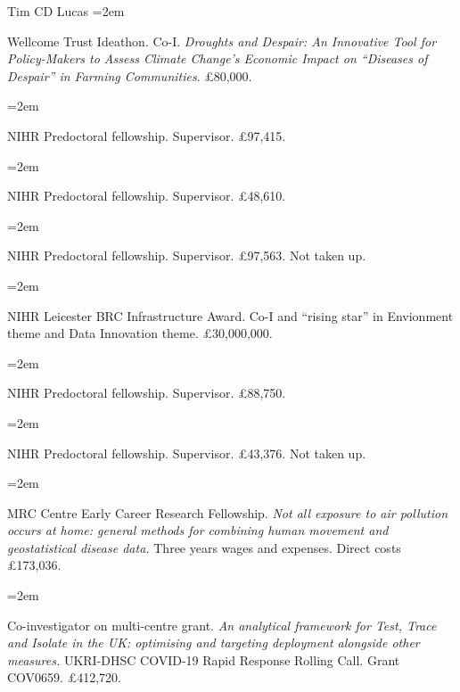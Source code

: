 \documentclass{scrartcl}
\newcommand{\MarginText}[1]{\marginpar{\raggedleft\itshape\small#1}} %
\newcommand{\Description}[1]{\hangindent=2em\hangafter=0\noindent\raggedright\footnotesize{#1}\par\normalsize\vspace{1em}} %
\begin{document}
\begin{cv}{Tim {\Large CD} Lucas}
\Description{Wellcome Trust Ideathon. Co-I. \emph{Droughts and Despair: An Innovative Tool for Policy-Makers to Assess Climate Change's Economic Impact on “Diseases of Despair” in Farming Communities}. £80,000.}
\vspace{-0.5em} %

\Description{NIHR Predoctoral fellowship. Supervisor. £97,415.}
\vspace{-0.5em} %

\Description{NIHR Predoctoral fellowship. Supervisor. £48,610.}
\vspace{-0.5em} %

\Description{NIHR Predoctoral fellowship. Supervisor. £97,563. Not taken up.}
\vspace{-0.5em} %

\Description{\MarginText{2022}NIHR Leicester BRC Infrastructure Award. Co-I and ``rising star'' in Envionment theme and Data Innovation theme. £30,000,000.}
\vspace{-0.5em} %


\Description{NIHR Predoctoral fellowship. Supervisor. £88,750.}
\vspace{-0.5em} %

\Description{NIHR Predoctoral fellowship. Supervisor. £43,376. Not taken up.}
\vspace{-0.5em} %


\Description{\MarginText{2020}MRC Centre Early Career Research Fellowship. \emph{Not all exposure to air pollution occurs at home: general methods for combining human movement and geostatistical disease data.} Three years wages and expenses. Direct costs £173,036.}
\vspace{-0.5em} %


\Description{Co-investigator on multi-centre grant. \emph{An analytical framework for Test, Trace and Isolate in the UK: optimising and targeting deployment alongside other measures.} UKRI-DHSC COVID-19 Rapid Response Rolling Call. Grant COV0659. £412,720.}
\vspace{-0.5em} %




\end{cv}
\end{document}
